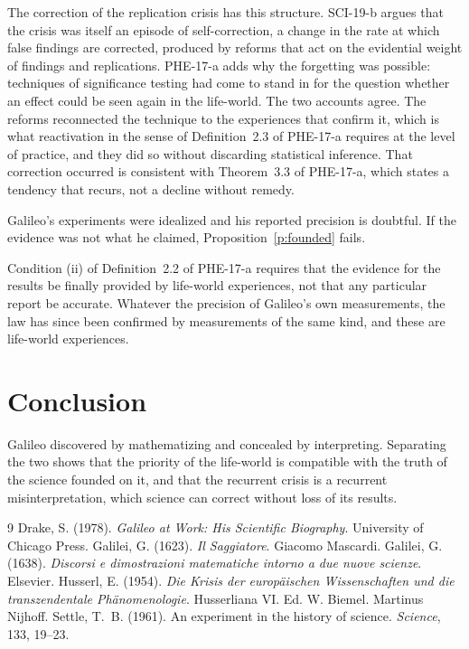 \documentclass{situationist-preprint}
\begin{document}
The correction of the replication crisis has this structure. SCI-19-b argues that the crisis was itself an episode of self-correction, a change in the rate at which false findings are corrected, produced by reforms that act on the evidential weight of findings and replications. PHE-17-a adds why the forgetting was possible: techniques of significance testing had come to stand in for the question whether an effect could be seen again in the life-world. The two accounts agree. The reforms reconnected the technique to the experiences that confirm it, which is what reactivation in the sense of Definition~2.3 of PHE-17-a requires at the level of practice, and they did so without discarding statistical inference. That correction occurred is consistent with Theorem~3.3 of PHE-17-a, which states a tendency that recurs, not a decline without remedy.

\begin{objection}
Galileo's experiments were idealized and his reported precision is doubtful. If the evidence was not what he claimed, Proposition~\ref{p:founded} fails.
\end{objection}

\begin{reply}
Condition (ii) of Definition~2.2 of PHE-17-a requires that the evidence for the results be finally provided by life-world experiences, not that any particular report be accurate. Whatever the precision of Galileo's own measurements, the law has since been confirmed by measurements of the same kind, and these are life-world experiences.
\end{reply}

\section{Conclusion}

Galileo discovered by mathematizing and concealed by interpreting. Separating the two shows that the priority of the life-world is compatible with the truth of the science founded on it, and that the recurrent crisis is a recurrent misinterpretation, which science can correct without loss of its results.

\begin{thebibliography}{9}\small
{} Drake, S. (1978). \emph{Galileo at Work: His Scientific Biography}. University of Chicago Press.
 Galilei, G. (1623). \emph{Il Saggiatore}. Giacomo Mascardi.
 Galilei, G. (1638). \emph{Discorsi e dimostrazioni matematiche intorno a due nuove scienze}. Elsevier.
 Husserl, E. (1954). \emph{Die Krisis der europ\"aischen Wissenschaften und die transzendentale Ph\"anomenologie}. Husserliana VI. Ed. W. Biemel. Martinus Nijhoff.
 Settle, T.~B. (1961). An experiment in the history of science. \emph{Science}, 133, 19--23.
\end{thebibliography}
\end{document}
